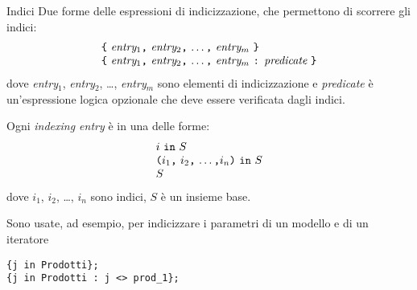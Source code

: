 \documentclass{beamer}
\begin{document}
\begin{frame}{Indici}
Due forme delle espressioni di indicizzazione, che permettono di scorrere
gli indici:
$$
{
\begin{array}{l}
\mbox{{\tt\{} {\it entry}$_1${\tt,} {\it entry}$_2${\tt,} \dots{\tt,}
{\it entry}$_m$ {\tt\}}}\\
\mbox{{\tt\{} {\it entry}$_1${\tt,} {\it entry}$_2${\tt,} \dots{\tt,}
{\it entry}$_m$ {\tt:} {\it predicate} {\tt\}}}\\
\end{array}
}
$$
dove {\it entry}{$_1$}, {\it entry}{$_2$}, \dots, {\it entry}{$_m$}
sono elementi di indicizzazione e {\it predicate} \`e un'espressione
logica opzionale che deve essere verificata dagli indici.

Ogni {\it indexing entry} \`e in una delle forme:
$$
{
\begin{array}{l}
\mbox{$i$ {\tt in} $S$}\\
\mbox{{\tt(}$i_1${\tt,} $i_2${\tt,} \dots{\tt,}$i_n${\tt)} {\tt in}
$S$}\\
\mbox{$S$}\\
\end{array}
}
$$
dove $i_1$, $i_2$, \dots, $i_n$ sono indici, $S$ \`e un insieme base.

Sono usate, ad esempio, per indicizzare i parametri di un modello e di un iteratore

\begin{lstlisting}
{j in Prodotti};
{j in Prodotti : j <> prod_1};
\end{lstlisting}
\end{frame}
\end{document}
